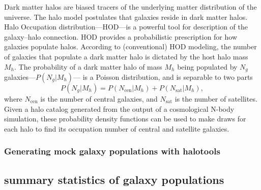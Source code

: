 \documentclass[12pt, preprint]{aastex}
\newcommand{\beq}{\begin{equation}}
\newcommand{\eeq}{\end{equation}}
\begin{document}
Dark matter halos are biased tracers of the underlying matter distribution of the universe. The halo model postulates that galaxies reside in dark matter halos. Halo Occupation distribution---HOD---is a powerful tool for description of the galaxy--halo connection. HOD provides a probabilistic prescription for how galaxies populate halos. According to (conventional) HOD modeling, the number of galaxies that populate a dark matter halo is dictated by the host halo mass $M_h$. The probability of a dark matter halo of mass $M_h$ being populated by $N_g$ galaxies---$P(N_g|M_h)$--- is a Poisson distribution, and is separable to two parts 
\beq
P(N_g|M_h) = P(N_\mathrm{cen}|M_h) + P(N_\mathrm{sat}|M_h),
\eeq
where $N_\mathrm{cen}$ is the number of central galaxies, and $N_\mathrm{sat}$ is the number of satellites. Given a halo catalog generated from the output of a cosmological N-body simulation, these probability density functions can be used to make draws for each halo to find its occupation number of central and satellite galaxies.

\subsubsection{Generating mock galaxy populations with halotools}

\subsection{summary statistics of galaxy populations}
\end{document}
